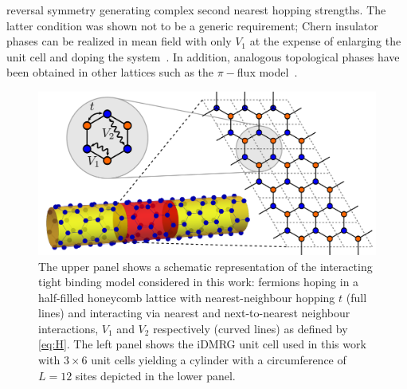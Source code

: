 \documentclass[aps,prx,10pt,twocolumn,floatfix,superscriptaddress,showpacs,numerical,footinbib]{revtex4-1}
\begin{document}
reversal symmetry generating complex second nearest hopping strengths.
%
The latter condition 
was shown not to be a generic requirement; Chern insulator phases can be realized 
in mean field with only $V_{1}$ at the expense of enlarging the unit cell and doping the system~\cite{CGV11,GCC13}.
%
In addition, analogous topological phases have been obtained in other lattices such as the $\pi-$flux model~\cite{WF10,JGC13}.
%
\begin{figure}
%
 \includegraphics[width=\columnwidth]{pdf/unit_cell.pdf}
 \caption{The upper panel shows a schematic representation of the interacting tight binding model considered in this work:
fermions hoping in a half-filled honeycomb lattice with nearest-neighbour hopping $t$ (full lines) and interacting via
 nearest and next-to-nearest neighbour interactions, $V_{1}$ and $V_{2}$ respectively (curved lines) as defined by 
 \eqref{eq:H}.
 The left panel shows the iDMRG unit cell used in this work with 
 $3 \times 6$ unit cells yielding a cylinder with a circumference of $L=12$ sites depicted in the lower panel. 
 \label{fig:Defs}}
\end{figure}
\\
\end{document}
